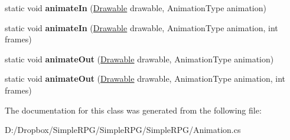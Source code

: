 \begin{DoxyCompactItemize}
\item 
\hypertarget{class_simple_r_p_g_1_1_animation_a57887aeb5e46066b4426e2fa8d715175}{static void {\bfseries animate\+In} (\hyperlink{class_simple_r_p_g_1_1_drawable}{Drawable} drawable, Animation\+Type animation)}\label{class_simple_r_p_g_1_1_animation_a57887aeb5e46066b4426e2fa8d715175}

\item 
\hypertarget{class_simple_r_p_g_1_1_animation_a45e21ce9caf65cc315313632a1ecb201}{static void {\bfseries animate\+In} (\hyperlink{class_simple_r_p_g_1_1_drawable}{Drawable} drawable, Animation\+Type animation, int frames)}\label{class_simple_r_p_g_1_1_animation_a45e21ce9caf65cc315313632a1ecb201}

\item 
\hypertarget{class_simple_r_p_g_1_1_animation_a3fa90da4edd15c14c9a84ade2274dba0}{static void {\bfseries animate\+Out} (\hyperlink{class_simple_r_p_g_1_1_drawable}{Drawable} drawable, Animation\+Type animation)}\label{class_simple_r_p_g_1_1_animation_a3fa90da4edd15c14c9a84ade2274dba0}

\item 
\hypertarget{class_simple_r_p_g_1_1_animation_a7b584db5a90bc132011bb3f630193d4d}{static void {\bfseries animate\+Out} (\hyperlink{class_simple_r_p_g_1_1_drawable}{Drawable} drawable, Animation\+Type animation, int frames)}\label{class_simple_r_p_g_1_1_animation_a7b584db5a90bc132011bb3f630193d4d}

\end{DoxyCompactItemize}


The documentation for this class was generated from the following file\+:\begin{DoxyCompactItemize}
\item 
D\+:/\+Dropbox/\+Simple\+R\+P\+G/\+Simple\+R\+P\+G/\+Simple\+R\+P\+G/Animation.\+cs\end{DoxyCompactItemize}
